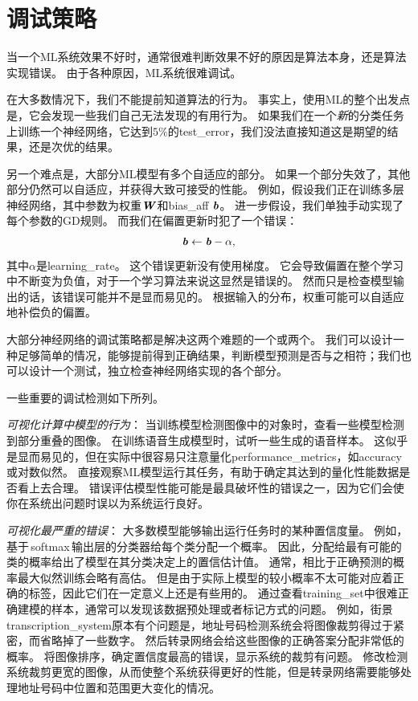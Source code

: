 \section{调试策略}
\label{sec:debugging_strategies}
当一个\gls{ML}系统效果不好时，通常很难判断效果不好的原因是算法本身，还是算法实现错误。
由于各种原因，\gls{ML}系统很难调试。


在大多数情况下，我们不能提前知道算法的行为。
事实上，使用\gls{ML}的整个出发点是，它会发现一些我们自己无法发现的有用行为。
如果我们在一个\emph{新}的分类任务上训练一个神经网络，它达到$5\%$的\gls{test_error}，我们没法直接知道这是期望的结果，还是次优的结果。


另一个难点是，大部分\gls{ML}模型有多个自适应的部分。
如果一个部分失效了，其他部分仍然可以自适应，并获得大致可接受的性能。
例如，假设我们正在训练多层神经网络，其中参数为权重$\boldsymbol{\mathit{W}}$和\gls{bias_aff} $\boldsymbol{\mathit{b}}$。
进一步假设，我们单独手动实现了每个参数的\gls{GD}规则。
而我们在偏置更新时犯了一个错误：
\begin{equation}
	\boldsymbol{\mathit{b}} \leftarrow \boldsymbol{\mathit{b}} - \alpha,
\end{equation}
其中$\alpha$是\gls{learning_rate}。
这个错误更新没有使用梯度。
它会导致偏置在整个学习中不断变为负值，对于一个学习算法来说这显然是错误的。 
然而只是检查模型输出的话，该错误可能并不是显而易见的。
根据输入的分布，权重可能可以自适应地补偿负的偏置。


大部分神经网络的调试策略都是解决这两个难题的一个或两个。
我们可以设计一种足够简单的情况，能够提前得到正确结果，判断模型预测是否与之相符；我们也可以设计一个测试，独立检查神经网络实现的各个部分。


一些重要的调试检测如下所列。

\emph{可视化计算中模型的行为}：%
当训练模型检测图像中的对象时，查看一些模型检测到部分重叠的图像。
在训练语音生成模型时，试听一些生成的语音样本。
这似乎是显而易见的，但在实际中很容易只注意量化\gls{performance_metrics}，如\gls{accuracy}或对数似然。
直接观察\gls{ML}模型运行其任务，有助于确定其达到的量化性能数据是否看上去合理。
错误评估模型性能可能是最具破坏性的错误之一，因为它们会使你在系统出问题时误以为系统运行良好。


\emph{可视化最严重的错误}：
大多数模型能够输出运行任务时的某种置信度量。
例如，基于\,\gls{softmax}\,输出层的分类器给每个类分配一个概率。
因此，分配给最有可能的类的概率给出了模型在其分类决定上的置信估计值。
通常，相比于正确预测的概率最大似然训练会略有高估。
但是由于实际上模型的较小概率不太可能对应着正确的标签，因此它们在一定意义上还是有些用的。
通过查看\gls{training_set}中很难正确建模的样本，通常可以发现该数据预处理或者标记方式的问题。
例如，街景\gls{transcription_system}原本有个问题是，地址号码检测系统会将图像裁剪得过于紧密，而省略掉了一些数字。
然后转录网络会给这些图像的正确答案分配非常低的概率。
将图像排序，确定置信度最高的错误，显示系统的裁剪有问题。
修改检测系统裁剪更宽的图像，从而使整个系统获得更好的性能，但是转录网络需要能够处理地址号码中位置和范围更大变化的情况。



